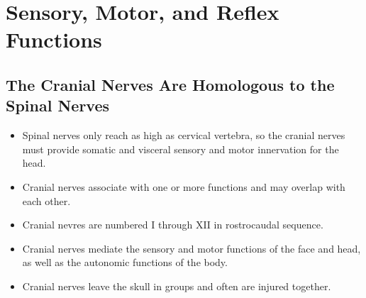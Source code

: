 \documentclass[12pt,a4paper]{article}
\begin{document}
\clearpage
{}

\clearpage
\setcounter{section}{44}
\section{Sensory, Motor, and Reflex Functions}
\subsection{The Cranial Nerves Are Homologous to the Spinal Nerves}
\begin{itemize}
    \item Spinal nerves only reach as high as cervical vertebra, so the cranial nerves must provide somatic and visceral sensory and motor innervation for the head.
    \item Cranial nerves associate with one or more functions and may overlap with each other.
    \item Cranial nevres are numbered I through XII in rostrocaudal sequence.
    \item Cranial nerves mediate the sensory and motor functions of the face and head, as well as the autonomic functions of the body.
    \item Cranial nerves leave the skull in groups and often are injured together.
\end{itemize}
\end{document}
